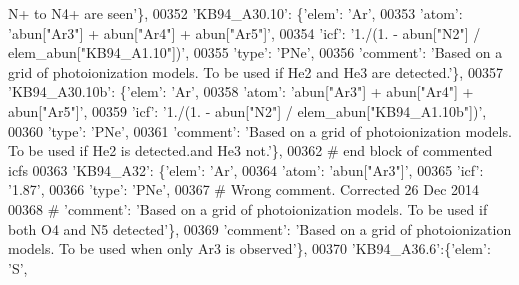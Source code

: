 \begin{DoxyCode}
{       N+ to N4+ are seen'}\},
00352                          \textcolor{stringliteral}{'KB94\_A30.10'}: \{\textcolor{stringliteral}{'elem'}: \textcolor{stringliteral}{'Ar'},
00353                                      \textcolor{stringliteral}{'atom'}: \textcolor{stringliteral}{'abun["Ar3"] + abun["Ar4"] + abun["Ar5"]'},
00354                                      \textcolor{stringliteral}{'icf'}: \textcolor{stringliteral}{'1./(1. - abun["N2"] / elem\_abun["KB94\_A1.10"])'},
00355                                      \textcolor{stringliteral}{'type'}: \textcolor{stringliteral}{'PNe'},
00356                                       \textcolor{stringliteral}{'comment'}: \textcolor{stringliteral}{'Based on a grid of photoionization models. To be used if
       He2 and He3 are detected.'}\},
00357                          \textcolor{stringliteral}{'KB94\_A30.10b'}: \{\textcolor{stringliteral}{'elem'}: \textcolor{stringliteral}{'Ar'},
00358                                      \textcolor{stringliteral}{'atom'}: \textcolor{stringliteral}{'abun["Ar3"] + abun["Ar4"] + abun["Ar5"]'},
00359                                      \textcolor{stringliteral}{'icf'}: \textcolor{stringliteral}{'1./(1. - abun["N2"] / elem\_abun["KB94\_A1.10b"])'},
00360                                      \textcolor{stringliteral}{'type'}: \textcolor{stringliteral}{'PNe'},
00361                                       \textcolor{stringliteral}{'comment'}: \textcolor{stringliteral}{'Based on a grid of photoionization models. To be used if
       He2 is detected.and He3 not.'}\},
00362 \textcolor{comment}{# end block of commented icfs}
00363                          \textcolor{stringliteral}{'KB94\_A32'}: \{\textcolor{stringliteral}{'elem'}: \textcolor{stringliteral}{'Ar'},
00364                                      \textcolor{stringliteral}{'atom'}: \textcolor{stringliteral}{'abun["Ar3"]'},
00365                                      \textcolor{stringliteral}{'icf'}: \textcolor{stringliteral}{'1.87'},
00366                                      \textcolor{stringliteral}{'type'}: \textcolor{stringliteral}{'PNe'},
00367 \textcolor{comment}{# Wrong comment. Corrected 26 Dec 2014}
00368 \textcolor{comment}{#                                      'comment': 'Based on a grid of photoionization models. To be used if
       both O4 and N5 detected'\},}
00369                                      \textcolor{stringliteral}{'comment'}: \textcolor{stringliteral}{'Based on a grid of photoionization models. To be used when
       only Ar3 is observed'}\},
00370                          \textcolor{stringliteral}{'KB94\_A36.6'}:\{\textcolor{stringliteral}{'elem'}: \textcolor{stringliteral}{'S'},

\end{DoxyCode}
